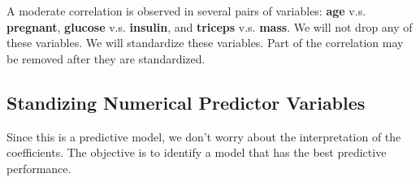 \documentclass[
]{book}
\begin{document}
A moderate correlation is observed in several pairs of variables: \textbf{age} v.s. \textbf{pregnant}, \textbf{glucose} v.s. \textbf{insulin}, and \textbf{triceps} v.s. \textbf{mass}. We will not drop any of these variables. We will standardize these variables. Part of the correlation may be removed after they are standardized.

\hypertarget{standizing-numerical-predictor-variables}{%
\subsection{Standizing Numerical Predictor Variables}\label{standizing-numerical-predictor-variables}}

Since this is a predictive model, we don't worry about the interpretation of the coefficients. The objective is to identify a model that has the best predictive performance.
\end{document}
